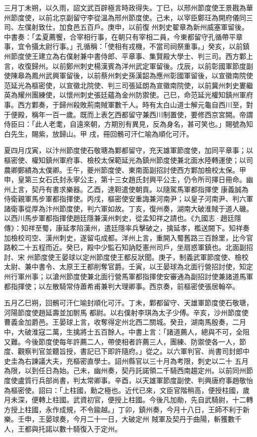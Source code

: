 \begin{pinyinscope}
 三月丁未朔，以久雨，詔文武百辟極言時政得失。丁巳，以邢州節度使王景戡為華州節度使，以前北京副留守李從溫為邢州節度使。己未，以宰臣鄭玨為開府儀同三司、左僕射致仕，加食邑五百戶。庚申，以前復
 州刺史翟章為新州威塞軍留後。中書奏：「孟夏薦饗，合宰相行事，在朝只有宰相二員，今東都留守孔循帶平章事，宜令攝太尉行事。」孔循稱：「使相有戎機，不當司祠祭重事。」癸亥，以前鎮州節度使王建立為右僕射兼中書侍郎、平章事、集賢殿大學士、判三司。西方鄴上言，收復歸州。以前鄭州刺史楊漢賓為洋州武定軍留後。戊辰，以前彰國軍節度副使陳皋為鳳州武興軍留後，以前蔡州刺史孫漢韶為應州彰國軍留後，以宣徽南院使
 范延光為樞密使，以宣徽北院使、判三司張延朗為宣徽南院使，以前冀州刺史婁繼英為耀州團練使，以懷州刺史張廷蘊為金州防禦使。己巳，命范延光權知鎮州軍府事。西方鄴奏，于歸州殺敗荊南賊軍數千人。時有太白山道士解元龜自西川至，對于便殿，稱年一百一歲。既而上表乞西都留守兼西川制置使，要修西京宮闕。帝謂侍臣曰：「此人老耄，自遠來朝，方期別有異見，反為身名，甚可笑也。」賜號為知白先生，賜紫，放歸山。甲
 戌，冊回鶻可汗仁喻為順化可汗。



 夏四月戊寅，以汴州節度使石敬瑭為鄴都留守，充天雄軍節度使，加同平章事；以樞密使、權知鎮州軍府事、檢校太保範延光為鎮州節度使兼北面水陸轉運使；以司農卿鄭繢為太僕卿。壬午，夔州節度使、東南面副招討使西方鄴加檢校太保。甲申，皇第三女石氏封永寧公主，第十三女趙氏封興平公主，仍令所司擇日冊命。幽州上言，契丹有書求樂器。乙酉，達靼遣使朝貢。以隨駕馬軍都指揮使
 康義誠為侍衛親軍馬步軍都指揮使。丙戌，樞密使安重誨兼河南尹；以皇子河南尹、判六軍諸衛事從厚為汴州節度使，判六軍如故。丁亥，復州奏，湖南大破淮賊于道人磯。以西川馬步軍都指揮使趙廷隱兼漢州刺史，從孟知祥之請也。《九國志·趙廷隱傳》：知祥至蜀，康延孝陷漢州，遣廷隱率兵擊破之，擒延孝，檻送闕下。知祥奏加檢校司空、漢州刺史，遂留屯成都。洋州上言，重開入蜀舊路三百餘里，比今官路較二十五程而近。癸巳，殿中少監石知訥貶憲州司戶，坐扇惑軍鎮也。北面副招討、宋
 州節度使王晏球以定州節度使王都反狀聞。庚子，制義武軍節度使、檢校太尉、兼中書令、太原王王都削奪官爵。壬寅，以王晏球為北面行營招討使，知定州行軍州事；以滄州節度使兼北面行營馬軍都指揮使安審通為副招討使兼諸道馬軍都指揮使；以左散騎常侍蕭希甫兼判大理卿事。西京奏，前樞密使張居翰卒。



 五月乙巳朔，回鶻可汗仁喻封順化可汗。丁未，鄴都留守、天雄軍節度使石敬瑭，河陽節度使趙延壽並加駙馬
 都尉。以右僕射李琪為太子少傅。辛亥，沙州節度使曹義金加爵邑。王晏球上言，收奪得定州北西二關城。癸丑，湖南馬殷奏，二月中，大破淮寇二萬，生擒將士五百餘人。中書上言：「諸道薦人，總與不可，全阻又難。今後節度使每年許薦二人，帶使相者許薦三人，團練、防禦使各一人，節度、觀察判官並聽旨授，書記已下即許隨府。」從之。以六軍判官、尚書司封郎中史圭為右諫議大夫，充樞密直學士。詔州縣官以三十月為考限，刺史以二十
 五月為限，以到任日為始。己未，幽州奏，契丹託諾領二千騎西南趨定州。以前同州節度使盧質行兵部尚書，判太常卿事。辛酉，以天雄軍節度副使、判興唐府事趙敬怡為樞密使。詔曰：「上柱國，勳之極也。近代已來，文臣官階稍高，便授柱國，歲月未深，便轉上柱國。武資初官，便授上柱國。今後凡加勛，先自武騎尉，十二轉方授上柱國，永作成規，不令踰越。」丁卯，鎮州奏，今月十八日，王師不利于新樂。壬申，王晏球奏，今月二十一日，大破定州
 賊軍及契丹于曲陽，斬獲數千人，王都與托諾以數十騎復入于定州。




\end{pinyinscope}
